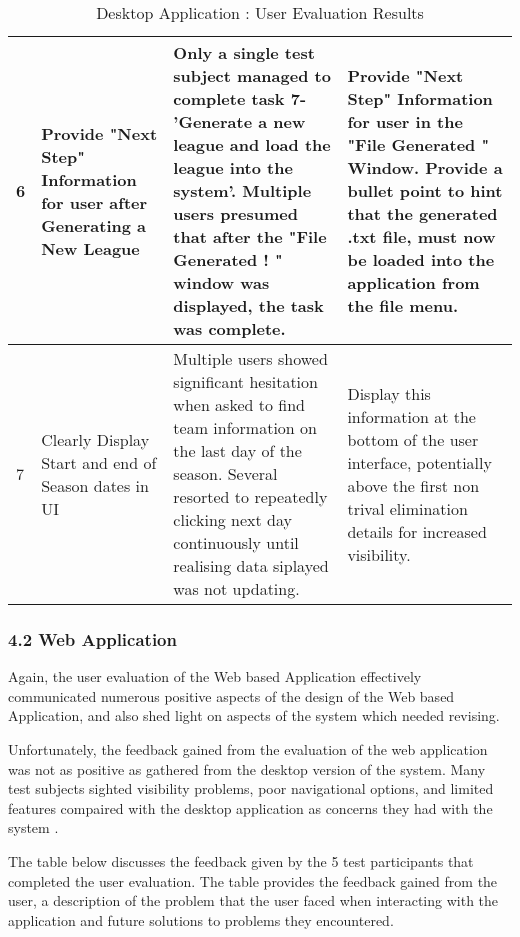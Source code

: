 \begin{table}[t]
\begin{tabular}{|l|p{}|p{}|p{}|}
\hline
6 & Provide "Next Step" Information for user after Generating a New League   & Only a single test subject managed to complete task 7- 'Generate a new league and load the league into the system'. Multiple users presumed that after the "File Generated ! " window was displayed, the task was complete.   & Provide "Next Step" Information for user in the "File Generated " Window. Provide a bullet point to hint that the generated .txt file, must now be loaded into the application from the file menu.     \\
\hline
7 & Clearly Display Start and end of Season dates in UI   & Multiple users showed significant hesitation when asked to find team information on the last day of the season. Several resorted to repeatedly clicking next day continuously until realising data siplayed was not updating. &  Display this information at the bottom of the user interface, potentially above the first non trival elimination details for increased visibility.   \\
\hline

\hline
\end{tabular}
\caption{Desktop Application : User Evaluation Results}
\label{tab:template}
\end{table}
 	 

\subsubsection{4.2 Web Application}


Again, the user evaluation of the Web based Application effectively communicated numerous positive aspects of the design of the Web based Application, and also shed light on aspects of the system which needed revising. 

Unfortunately, the feedback gained from the evaluation of the web application was not as positive as gathered from the desktop version of the system. Many test subjects sighted visibility problems, poor navigational options, and limited features compaired with the desktop application as concerns they had with the system . 

The table below discusses the feedback given by the 5 test participants that completed the user evaluation. The table provides the feedback gained from the user, a description of the problem that the user faced when interacting with the application and future solutions to problems they encountered. 
    




